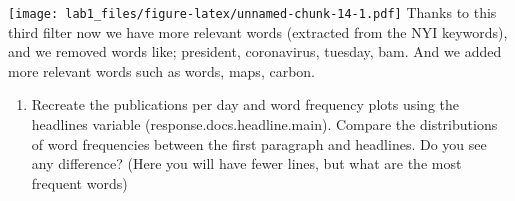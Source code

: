 \documentclass[
]{article}
\providecommand{\tightlist}{%
  \setlength{\itemsep}{0pt}\setlength{\parskip}{0pt}}
\begin{document}
\texttt{[image: lab1\_files/figure-latex/unnamed-chunk-14-1.pdf]} Thanks
to this third filter now we have more relevant words (extracted from the
NYI keywords), and we removed words like; president, coronavirus,
tuesday, bam. And we added more relevant words such as words, maps,
carbon.

\begin{enumerate}
\def\labelenumi{\arabic{enumi}.}
\setcounter{enumi}{3}
\tightlist
\item
  Recreate the publications per day and word frequency plots using the
  headlines variable (response.docs.headline.main). Compare the
  distributions of word frequencies between the first paragraph and
  headlines. Do you see any difference? (Here you will have fewer lines,
  but what are the most frequent words)
\end{enumerate}
\end{document}
